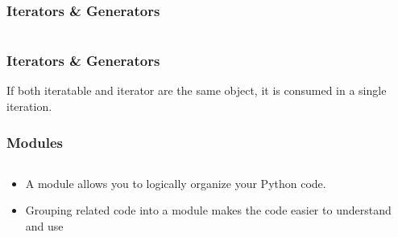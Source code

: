 \documentclass{beamer}
\begin{document}
\begin{frame}[fragile]
	\frametitle{Iterators \& Generators}
	\begin{columns}[c]
		\begin{column}{30cm}
			\vspace{.1cm}
		\end{column}
	\end{columns}
\end{frame}

\begin{frame}
	\frametitle{Iterators \& Generators}
	\begin{Huge}
		\begin{center}
			If both iteratable and iterator are the same object, it is consumed in a single iteration.
		\end{center}
	\end{Huge}
\end{frame}

\begin{frame}
	\frametitle{Modules}
	\begin{columns}[c]
		\begin{column}{30cm}
			\vspace{.1cm}
			\begin{itemize}
				\justifying
				\item A module allows you to logically organize your Python code.
				\item Grouping related code into a module makes the code easier to understand and use
			\end{itemize}
		\end{column}
	\end{columns}
\end{frame}
\end{document}
